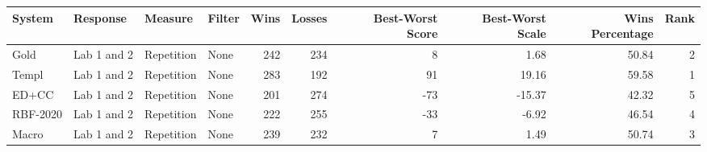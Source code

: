 \begin{tabular}{llllrrrrrr}
\toprule
System & Response & Measure & Filter & Wins & Losses & Best-Worst Score & Best-Worst Scale & Wins Percentage & Rank \\
\midrule
Gold & Lab 1 and 2 & Repetition & None & 242 & 234 & 8 & 1.68 & 50.84 & 2 \\
Templ & Lab 1 and 2 & Repetition & None & 283 & 192 & 91 & 19.16 & 59.58 & 1 \\
ED+CC & Lab 1 and 2 & Repetition & None & 201 & 274 & -73 & -15.37 & 42.32 & 5 \\
RBF-2020 & Lab 1 and 2 & Repetition & None & 222 & 255 & -33 & -6.92 & 46.54 & 4 \\
Macro & Lab 1 and 2 & Repetition & None & 239 & 232 & 7 & 1.49 & 50.74 & 3 \\
\bottomrule
\end{tabular}
